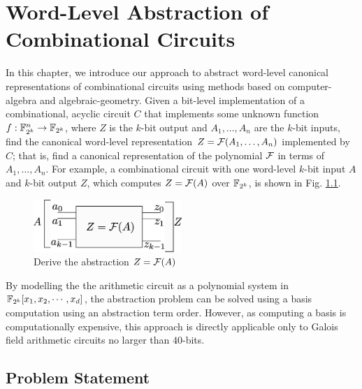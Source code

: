 \chapter{Word-Level Abstraction of Combinational Circuits} \label{ch:abstract}

In this chapter, we introduce our approach to abstract word-level
canonical representations of combinational circuits using methods based on 
computer-algebra and algebraic-geometry.  
Given a bit-level implementation of a combinational, acyclic circuit $C$ that
implements some unknown function $f:{\mathbb{F}}_{2^k}^n\rightarrow{\mathbb{F}}_{2^k}$, where
$Z$ is the $k$-bit output and $A_1,\dots,A_n$ are the $k$-bit inputs,
find the canonical word-level representation $Z={\mathcal{F}}(A_1,\dots,A_n)$ 
implemented by $C$; that is, find a canonical representation of the
polynomial ${\mathcal{F}}$ in terms of $A_1,\dots,A_n$. For example, a combinational
circuit with one word-level $k$-bit input $A$ and $k$-bit output $Z$, 
which computes $Z={\mathcal{F}}(A)$ over ${\mathbb{F}}_{2^k}$,
is shown in Fig. \ref{fig:abstractA_Z2}.

{
\begin{figure}[h]
\centerline{
\includegraphics[width=0.5\textwidth]{./figures/interpolate}
}
\caption{Derive the abstraction $Z={\mathcal{F}}(A)$}
\label{fig:abstractA_Z2}
\end{figure}
}

By modelling the the arithmetic circuit as a polynomial system in
${\mathbb{F}}_{2^k}[x_1,x_2,\cdots,x_d]$, the abstraction problem 
can be solved using a \Grobner basis computation using an
abstraction term order. 
However, as computing a \Grobner basis is computationally
expensive, this approach is directly  applicable only to Galois field arithmetic
circuits no larger than $40$-bits.

\section{Problem Statement}

